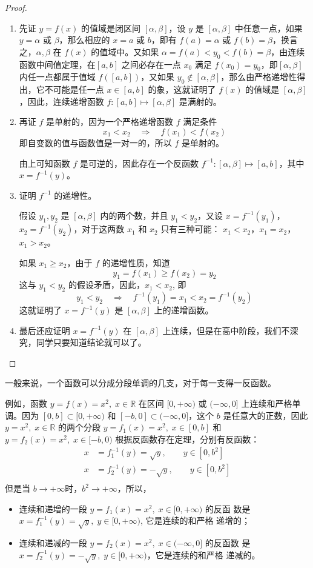 \begin{proof}
\begin{enumerate}
\item 先证 $y=f(x)$ 的值域是闭区间 $[\alpha,\beta]$，设 $y$ 是 $[\alpha,\beta]$ 中任意一点，如果 $y=\alpha$ 或 $\beta$，那么相应的 $x=a$ 或 $b$，即有 $f(a)=\alpha$ 或 $f(b)=\beta$，换言之，$\alpha ,\beta$ 在 $f(x)$ 的值域中。又如果 $\alpha=f(a)<y_0<f(b)=\beta$，由连续函数中间值定理，在$[a,b]$ 之间必存在一点 $x_0$ 满足 $f(x_0)=y_0$，即$[\alpha ,\beta]$  内任一点都属于值域 $f([a,b])$，又如果 $y_0\notin [\alpha ,\beta]$，那么由严格递增性得出，它不可能是任一点 $x\in [a,b]$ 的象，这就证明了 $f(x)$ 的值域是 $[\alpha,\beta]$，因此，连续递增函数 $f:[a,b]\mapsto [\alpha ,\beta]$ 是满射的。

\item 再证 $f$ 是单射的，因为一个严格递增函数 $f$ 满足条件
\[x_1<x_2\quad \Rightarrow\quad f(x_1)<f(x_2)\] 
即自变数的值与函数值是一对一的，所以 $f$ 是单射的。

由上可知函数 $f$ 是可逆的，因此存在一个反函数 $f^{-1}:[\alpha,\beta]\mapsto [a,b]$，其中$x=f^{-1}(y)$。
\item 证明 $f^{-1}$ 的递增性。

假设 $y_1,y_2$ 是 $[\alpha,\beta]$ 内的两个数，并且 $y_1<y_2$，又设 $x=f^{-1}(y_1)$，$x_2=f^{-1}(y_2)$，对于这两数 $x_1$ 和 $x_2$ 只有三种可能：
$x_1<x_2$，$x_1=x_2$，$x_1>x_2$。

如果 $x_1\geqslant x_2$，由于 $f$ 的递增性质，知道
\[y_1=f(x_1)\geqslant f(x_2)=y_2\]
这与 $y_1<y_2$ 的假设矛盾，因此，$x_1<x_2$, 即
\[y_1<y_2 \quad \Rightarrow\quad f^{-1}(y_1)=x_1<x_2=f^{-1}(y_2)\]
这就证明了 $x=f^{-1}(y)$ 是 $[\alpha,\beta]$ 上的递增函数。
\item 最后还应证明 $x=f^{-1}(y)$ 在 $[\alpha,\beta]$ 上连续，但是在高中阶段，我们不深究，同学只要知道结论就可以了。
\end{enumerate}    
\end{proof} 


一般来说，一个函数可以分成分段单调的几支，对于每一支得一反函数。

例如，函数 $y=f(x)=x^2,\; x\in\mathbb{R}$ 在区间 $[0,+\infty)$ 或 $(-\infty,0]$ 上连续和严格单调。因为 $[0,b]\subset [0,+\infty)$ 和 $[-b,0]\subset (-\infty,0] $，这个 $b$ 是任意大的正数，因此 $y=x^2,\; x\in\mathbb{R}$ 的两个分段 $y=f_1(x)=x^2,\; x\in [0,b]$ 和 $y=f_2(x)=x^2,\; x\in[-b,0)$ 根据反函数存在定理，分别有反函数：
\[\begin{split}
    x&=f^{-1}_1(y)=\sqrt{y},\qquad y\in [0,b^2]\\    
    x&=f^{-1}_2(y)=-\sqrt{y},\qquad y\in [0,b^2]\\
\end{split}\]
但是当 $b\to+\infty$时，$b^2\to+\infty$，所以，
\begin{itemize}
  \item 连续和递增的一段 $y=f_1(x)=x^2,\; x\in[0,+\infty)$ 的反函
数是 $x=f_1^{-1}(y)=\sqrt{y},\; y\in [0,+\infty)$, 它是连续的和严格
递增的；
\item 连续和递减的一段 $y=f_2(x)=x^2,\; x\in(-\infty,0]$ 的反函数
是 $x=f_2^{-1}(y)=-\sqrt{y},\; y\in[0,+\infty)$，它是连续的和严格
递减的。
\end{itemize}

